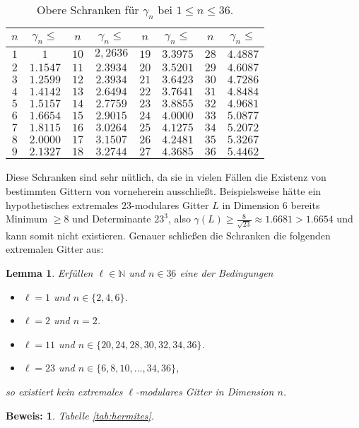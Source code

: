 \documentclass[12pt,a4paper,halfparskip,headsepline,bibtotocnumbered]{scrreprt}
\theoremstyle{nummermitklammern}
\newtheorem{lemma}[defsatzusw]{Lemma}
\theoremstyle{nonumberbreak}
\newtheorem{beweis}{Beweis:}
\newcommand{\N}{\mathbb{N}}
\begin{document}
\begin{table}[H]\label{tab:hermites}
\centering
	\begin{tabular}{|c|c||c|c||c|c||c|c|}
		\hline
		$n$		&$\gamma_n\leq$		&$n$	&$\gamma_n\leq$		&$n$	&$\gamma_n\leq$		&$n$	&$\gamma_n\leq$ \\ \hline
		$1$		&$1$				&$10$	&$2,2636$			&$19$	&$3.3975$			&$28$	&$4.4887$ \\ \hline
		$2$		&$1.1547$			&$11$	&$2.3934$			&$20$	&$3.5201$			&$29$	&$4.6087$ \\ \hline
		$3$		&$1.2599$			&$12$	&$2.3934$			&$21$	&$3.6423$			&$30$	&$4.7286$ \\ \hline
		$4$		&$1.4142$			&$13$	&$2.6494$			&$22$	&$3.7641$			&$31$	&$4.8484$ \\ \hline
		$5$		&$1.5157$			&$14$	&$2.7759$			&$23$	&$3.8855$			&$32$	&$4.9681$ \\ \hline
		$6$		&$1.6654$			&$15$	&$2.9015$			&$24$	&$4.0000$			&$33$	&$5.0877$ \\ \hline
		$7$		&$1.8115$			&$16$	&$3.0264$			&$25$	&$4.1275$			&$34$	&$5.2072$ \\ \hline
		$8$		&$2.0000$			&$17$	&$3.1507$			&$26$	&$4.2481$			&$35$	&$5.3267$ \\ \hline
		$9$		&$2.1327$			&$18$	&$3.2744$			&$27$	&$4.3685$			&$36$	&$5.4462$ \\
		\hline
	\end{tabular}
	\caption{Obere Schranken für $\gamma_n$ bei $1 \leq n \leq 36$.}
\end{table}

Diese Schranken sind sehr nütlich, da sie in vielen Fällen die Existenz von bestimmten Gittern von vorneherein ausschließt. Beispielsweise hätte ein hypothetisches extremales $23$-modulares Gitter $L$ in Dimension $6$ bereits Minimum $\geq 8$ und Determinante $23^3$, also $\gamma(L) \geq \frac{8}{\sqrt{23}} \approx 1.6681 > 1.6654$ und kann somit nicht existieren. Genauer schließen die Schranken die folgenden extremalen Gitter aus:

\begin{framed}
	\begin{lemma}
		Erfüllen $\ell \in \N$ und $n \in \underline{36}$ eine der Bedingungen
		\begin{itemize}
			\item $\ell = 1$ und $n \in \lbrace 2,4,6 \rbrace$.
			\item $\ell = 2$ und $n = 2$.
			\item $\ell = 11$ und $n \in \lbrace 20, 24, 28, 30, 32, 34, 36 \rbrace$.
			\item $\ell = 23$ und $n \in \lbrace 6, 8, 10, \dots, 34, 36 \rbrace$,
		\end{itemize}
		so existiert kein extremales $\ell$-modulares Gitter in Dimension $n$.
	\end{lemma}
\end{framed}
\begin{beweis}
	Tabelle \eqref{tab:hermites}.
\end{beweis}
\end{document}
